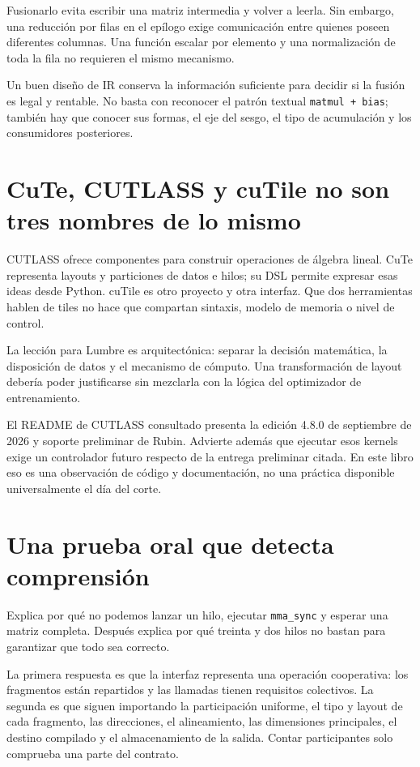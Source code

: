 \documentclass[12pt,a4paper,oneside]{report}
\begin{document}
Fusionarlo evita escribir una matriz intermedia y volver a leerla. Sin embargo, una reducción por filas en el epílogo exige comunicación entre quienes poseen diferentes columnas. Una función escalar por elemento y una normalización de toda la fila no requieren el mismo mecanismo.

Un buen diseño de IR conserva la información suficiente para decidir si la fusión es legal y rentable. No basta con reconocer el patrón textual \texttt{matmul + bias}; también hay que conocer sus formas, el eje del sesgo, el tipo de acumulación y los consumidores posteriores.

\section{CuTe, CUTLASS y cuTile no son tres nombres de lo mismo}
CUTLASS ofrece componentes para construir operaciones de álgebra lineal. CuTe representa layouts y particiones de datos e hilos; su DSL permite expresar esas ideas desde Python. cuTile es otro proyecto y otra interfaz. Que dos herramientas hablen de tiles no hace que compartan sintaxis, modelo de memoria o nivel de control. \cite{cutlass,cutile}

La lección para Lumbre es arquitectónica: separar la decisión matemática, la disposición de datos y el mecanismo de cómputo. Una transformación de layout debería poder justificarse sin mezclarla con la lógica del optimizador de entrenamiento.

El README de CUTLASS consultado presenta la edición 4.8.0 de septiembre de 2026 y soporte preliminar de Rubin. Advierte además que ejecutar esos kernels exige un controlador futuro respecto de la entrega preliminar citada. En este libro eso es una observación de código y documentación, no una práctica disponible universalmente el día del corte. \cite{cutlass}

\section{Una prueba oral que detecta comprensión}
\begin{practica}
Explica por qué no podemos lanzar un hilo, ejecutar \texttt{mma\_sync} y esperar una matriz completa. Después explica por qué treinta y dos hilos no bastan para garantizar que todo sea correcto.

\end{practica}
La primera respuesta es que la interfaz representa una operación cooperativa: los fragmentos están repartidos y las llamadas tienen requisitos colectivos. La segunda es que siguen importando la participación uniforme, el tipo y layout de cada fragmento, las direcciones, el alineamiento, las dimensiones principales, el destino compilado y el almacenamiento de la salida. Contar participantes solo comprueba una parte del contrato.
\end{document}
